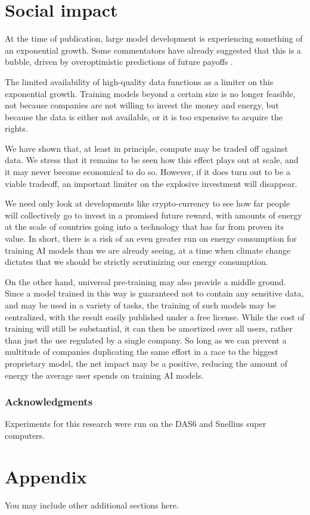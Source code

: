 \documentclass{article} %
\begin{document}
\section{Social impact}

At the time of publication, large model development is experiencing something of an exponential growth. Some commentators have already suggested that this is a bubble, driven by overoptimistic predictions of future payoffs \cite{}.

The limited availability of high-quality data functions as a limiter on this exponential growth. Training models beyond a certain size is no longer feasible, not because companies are not willing to invest the money and energy, but because the data is either not available, or it is too expensive to acquire the rights.

We have shown that, at least in principle, compute may be traded off against data. We stress that it remains to be seen how this effect plays out at scale, and it may never become economical to do so. However, if it does turn out to be a viable tradeoff, an important limiter on the explosive investment will disappear. 

We need only look at developments like crypto-currency to see how far people  will collectively go to invest in a promised future reward, with amounts of energy at the scale of countries going into a technology that has far from proven its value. In short, there is a risk of an even greater run on energy consumption for training AI models than we are already seeing, at a time when climate change dictates that we should be strictly scrutinizing our energy consumption.

On the other hand, universal pre-training may also provide a middle ground. Since a model trained in this way is guaranteed not to contain any sensitive data, and may be used in a variety of tasks, the training of such models may be centralized, with the result easily published under a free license. While the cost of training will still be substantial, it can then be amortized over all users, rather than just the use regulated by a single company. So long as we can prevent a multitude of companies duplicating the same effort in a race to the biggest proprietary model, the net impact may be a positive, reducing the amount of energy the average user spends on training AI models.

\subsubsection*{Acknowledgments} Experiments for this research were run on the DAS6 \cite{} and Snellius \cite{} super computers.




\appendix
\section{Appendix}
You may include other additional sections here.
\end{document}
